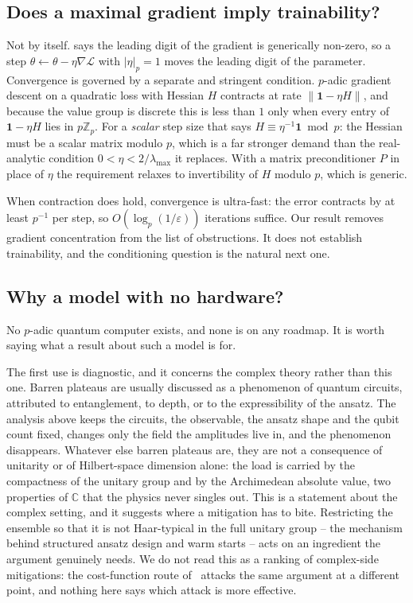 \documentclass{ceurart}
\theoremstyle{plain}
\theoremstyle{definition}
\theoremstyle{remark}
\theoremstyle{plain}
\newcommand{\Zp}{\mathbb{Z}_p}
\newcommand{\padicnorm}[1]{\left|#1\right|_p}
\newcommand{\opnorm}[1]{\left\|#1\right\|}
\newcommand{\Id}{\mathbf{1}}
\newcommand{\loss}{\mathcal{L}}
\begin{document}
\subsection{Does a maximal gradient imply trainability?}

Not by itself.  says the leading digit of the gradient is
generically non-zero, so a step $\theta\leftarrow\theta-\eta\nabla\loss$ with
$\padicnorm\eta=1$ moves the leading digit of the parameter. Convergence is
governed by a separate and stringent condition. $p$-adic gradient descent on a
quadratic loss with Hessian $H$ contracts at rate $\opnorm{\Id-\eta H}$, and
because the value group is discrete this is less than $1$ only when every entry
of $\Id-\eta H$ lies in $p\Zp$. For a \emph{scalar} step size that says
$H\equiv\eta^{-1}\Id\bmod p$: the Hessian must be a scalar matrix modulo $p$,
which is a far stronger demand than the real-analytic condition
$0<\eta<2/\lambda_{\max}$ it replaces. With a matrix preconditioner $P$ in
place of $\eta$ the requirement relaxes to invertibility of $H$ modulo $p$,
which is generic.

When contraction does hold, convergence is ultra-fast: the error contracts by
at least $p^{-1}$ per step, so $O(\log_p(1/\varepsilon))$ iterations suffice.
Our result removes gradient concentration from the list of obstructions. It
does not establish trainability, and the conditioning question is the natural
next one.

\subsection{Why a model with no hardware?}
\label{sec:why}

No $p$-adic quantum computer exists, and none is on any roadmap. It is worth
saying what a result about such a model is for.

The first use is diagnostic, and it concerns the complex theory rather than
this one. Barren plateaus are usually discussed as a phenomenon of quantum
circuits, attributed to entanglement, to depth, or to the expressibility of the
ansatz. The analysis above keeps the circuits, the observable, the ansatz shape
and the qubit count fixed, changes only the field the amplitudes live in, and
the phenomenon disappears. Whatever else barren plateaus are, they are not a
consequence of unitarity or of Hilbert-space dimension alone: the load is
carried by the compactness of the unitary group and by the Archimedean absolute
value, two properties of $\mathbb{C}$ that the physics never singles out. This
is a statement about the complex setting, and it suggests where a mitigation
has to bite. Restricting the ensemble so that it is not Haar-typical in
the full unitary group -- the mechanism behind structured ansatz design and
warm starts -- acts on an ingredient the argument genuinely needs. We do not
read this as a ranking of complex-side mitigations: the cost-function route
of~\cite{Ce21} attacks the same argument at a different point, and nothing here
says which attack is more effective.
\end{document}

